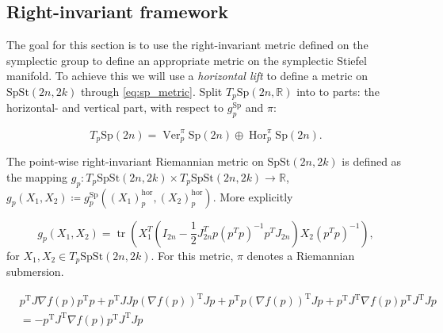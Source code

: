 \subsection{Right-invariant framework}


The goal for this section is to use the right-invariant metric defined on the symplectic group to define an appropriate metric on the symplectic Stiefel manifold. To achieve this we will use a \textit{horizontal lift} to define a metric on $\mathrm{SpSt}(2n, 2k)$ through \ref{eq:sp_metric}. Split $T_{p}\mathrm{Sp}(2n,\mathbb{R})$ into to parts: the horizontal- and vertical part, with respect to $g^\mathrm{Sp}_{p}$ and $\pi$: %

\begin{equation}\label{eq:spst_split}
    T_{p}\mathrm{Sp}(2n)=\operatorname{Ver}^{\pi}_{p}\mathrm{Sp}(2n)\oplus \operatorname{Hor}^{\pi}_{p}\mathrm{Sp}(2n).
\end{equation}

The point-wise right-invariant Riemannian metric on $\mathrm{SpSt}(2n, 2k)$ is defined as the mapping $g_{p}:T_{p}\mathrm{SpSt}(2n, 2k)\times T_{p}\mathrm{SpSt}(2n, 2k)\xrightarrow{}\mathbb{R}$, $g_{p}(X_{1},X_{2})\coloneqq g^{\mathrm{Sp}}_{p}((X_{1})^{\mathrm{hor}}_{p},(X_{2})^{\mathrm{hor}}_{p})$. More explicitly

\begin{equation}\label{eq:spst_metric}
    g_{p}(X_{1},X_{2})=\operatorname{tr}\left(X_{1}^{T}\left(I_{2n}- \frac{1}{2}J_{2n}^{T}p(p^{T}p)^{-1}p^{T}J_{2n}\right)X_{2}(p^{T}p)^{-1}\right),
\end{equation}
for $X_{1},X_{2}\in T_{p}\mathrm{SpSt}(2n, 2k)$. For this metric, $\pi$ denotes a Riemannian submersion.








\begin{align}
    &p^{\mathrm{T}}J\nabla f(p)p^{\mathrm{T}}p+p^{\mathrm{T}}JJp(\nabla f(p))^{\mathrm{T}}Jp+p^{\mathrm{T}}p(\nabla f(p))^{\mathrm{T}}Jp+p^{\mathrm{T}}J^{\mathrm{T}}\nabla f(p)p^{\mathrm{T}}J^{\mathrm{T}}Jp\\
    &= -p^{\mathrm{T}}J^{\mathrm{T}}\nabla f(p)p^{\mathrm{T}}J^{\mathrm{T}}Jp
\end{align}

